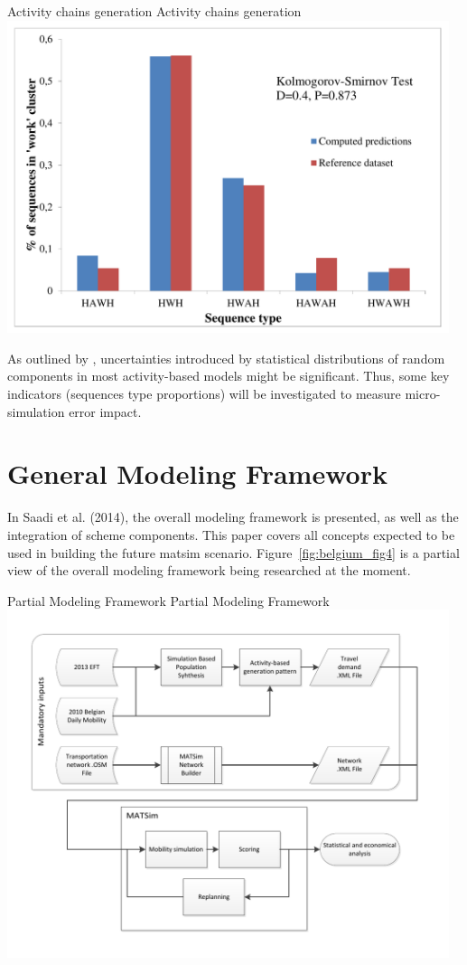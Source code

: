 \createfigure%
{Activity chains generation}%
{Activity chains generation}%
{\label{fig:belgium_fig3}}%
{\includegraphics[width=0.97\textwidth, angle=0]{scenarios/figures/belgium_fig3.pdf}}%
{}

As outlined by \citet[][]{CoolsEtAl_TRB_2011}, uncertainties introduced by statistical distributions of random components in most activity-based models might be significant. 
Thus, some key indicators (\eg sequences type proportions) will be investigated to measure micro-simulation error impact.

\section{General Modeling Framework}
In Saadi et al. (2014), the overall modeling framework is presented, as well as the integration of scheme components. 
This paper covers all concepts expected to be used in building the future \gls{matsim} scenario. 
Figure~\ref{fig:belgium_fig4} is a partial view of the overall modeling framework being researched at the moment.

\createfigure%
{Partial Modeling Framework}%
{Partial Modeling Framework}%
{\label{fig:belgium_fig4}}%
{\includegraphics[width=0.97\textwidth, angle=0]{scenarios/figures/belgium_fig4.pdf}}%
{}

